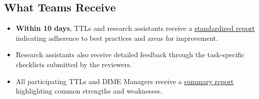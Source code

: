\documentclass{tufte-handout}
\begin{document}
\begin{fullwidth}
\section*{What Teams Receive}
\begin{itemize}
    \item \textbf{Within 10 days}, TTLs and research assistants receive a \href{https://github.com/worldbank/dime-standards/blob/d9111654531319fe96095d4bf0acf7fa0b66bacd/dime-coding-standards/checklists/samples/Sample%20TTL%20Report.pdf}{standardized report} indicating adherence to best practices and areas for improvement.
    \item Research assistants also receive detailed feedback through the task-specific checklists submitted by the reviewers.
    \item All participating TTLs and DIME Managers receive a \href{https://github.com/worldbank/dime-standards/blob/d9111654531319fe96095d4bf0acf7fa0b66bacd/dime-coding-standards/checklists/samples/Peer%20Code%20Review%20Summary%20-%20FY24%20Q3.pdf}{summary report} highlighting common strengths and weaknesses.
\end{itemize}


	\end{fullwidth}
\end{document}
